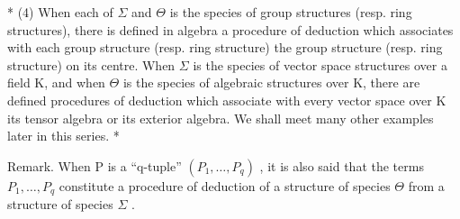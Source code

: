* (4) When each of \(\Sigma\) and \(\Theta\) is the species of group structures (resp. ring structures), there is defined in algebra a procedure of deduction which associates with each group structure (resp. ring structure) the group structure (resp. ring structure) on its centre. When \(\Sigma\) is the species of vector space structures over a field K, and when \(\Theta\) is the species of algebraic structures over K, there are defined procedures of deduction which associate with every vector space over K its tensor algebra or its exterior algebra. We shall meet many other examples later in this series. *

Remark. When P is a ``q-tuple'' \((P_{1}, \ldots, P_{q})\) , it is also said that the terms \(P_{1}, \ldots, P_{q}\) constitute a procedure of deduction of a structure of species \(\Theta\) from a structure of species \(\Sigma\) .

